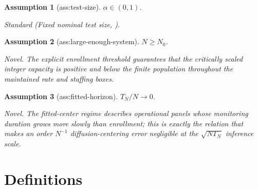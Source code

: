 \documentclass{article}
\newtheorem{assumption}{Assumption}
\begin{document}
\begin{assumption}[ass:test-size]\label{ass:test-size}
\(\alpha\in(0,1)\).
\par\smallskip\noindent\emph{Standard} (Fixed nominal test size, \cite{vanDerVaart1998}).
\end{assumption}

\begin{assumption}[ass:large-enough-system]\label{ass:large-enough-system}
\(N\ge N_0\).
\par\smallskip\noindent\emph{Novel.} The explicit enrollment threshold guarantees that the critically scaled integer capacity is positive and below the finite population throughout the maintained rate and staffing boxes.
\end{assumption}

\begin{assumption}[ass:fitted-horizon]\label{ass:fitted-horizon}
\(T_N/N\to0\).
\par\smallskip\noindent\emph{Novel.} The fitted-center regime describes operational panels whose monitoring duration grows more slowly than enrollment; this is exactly the relation that makes an order \(N^{-1}\) diffusion-centering error negligible at the \(\sqrt{NT_N}\) inference scale.
\end{assumption}

\section{Definitions}
\end{document}
